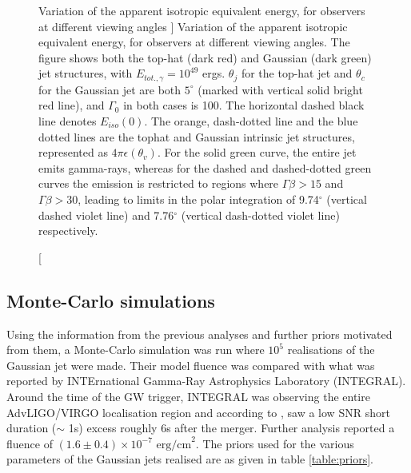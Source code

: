     \begin{figure}
        \centering
        \def\svgwidth{\textwidth}
        
        \caption
        [
            Variation of the apparent isotropic equivalent energy, for observers at
            different viewing angles
        ]
        {
            Variation of the apparent isotropic equivalent energy, for observers at
            different viewing angles. The figure shows both the top-hat (dark red)
            and Gaussian (dark green) jet structures, with $E_{tot., \gamma} =
            10^{49}$ ergs. $\theta_j$ for the top-hat jet and $\theta_c$ for the
            Gaussian jet are both $5^{\circ}$ (marked with vertical solid bright
            red line), and $\Gamma_0$ in both cases is 100. The horizontal dashed
            black line denotes $E_{iso}(0)$. The orange, dash-dotted line and the
            blue dotted lines are the tophat and Gaussian intrinsic jet structures,
            represented as $4\pi\epsilon(\theta_v)$. For the solid green curve, the
            entire jet emits gamma-rays, whereas for the dashed and dashed-dotted
            green curves the emission is restricted to regions where $\Gamma \beta
            > 15$ and $\Gamma \beta  > 30$, leading to limits in the polar
            integration of 9.74$^\circ$ (vertical dashed violet line) and
            7.76$^\circ$ (vertical dash-dotted violet line) respectively.
        }
        \label{fig:e_iso}
    \end{figure}

    \subsection{Monte-Carlo simulations}
    \label{sec:mc_sim}

    Using the information from the previous analyses and further priors motivated from
    them, a Monte-Carlo simulation was run where $10^5$ realisations of the Gaussian jet
    were made. Their model fluence was compared with what was reported by INTErnational
    Gamma-Ray Astrophysics Laboratory (INTEGRAL).\\ Around the time of the GW trigger,
    INTEGRAL was observing the entire AdvLIGO/VIRGO localisation region and according to
    \cite{minaev_gcn_2019}, saw a low SNR short duration ($\sim$ 1s) excess roughly 6s
    after the merger. Further analysis reported a fluence of $(1.6 \pm 0.4) \times
    10^{-7} \text{ erg/cm}^2$. The priors used for the various parameters of the
    Gaussian jets realised are as given in table \ref{table:priors}.

